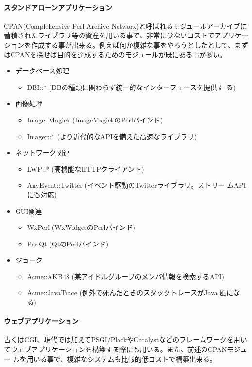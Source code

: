 \documentclass[a4paper,9pt]{jarticle}
\begin{document}
\paragraph{スタンドアローンアプリケーション}
CPAN(Complehensive Perl Archive Network)と呼ばれるモジュールアーカイブに
蓄積されたライブラリ等の資産を用いる事で、非常に少ないコストでアプリケー
ションを作成する事が出来る。例えば何か複雑な事をやろうとしたとして、まず
はCPANを探せば目的を達成するためのモジュールが既にある事が多い。
\begin{itemize}
 \item データベース処理
       \begin{itemize}
	\item DBI::* (DBの種類に関わらず統一的なインターフェースを提供す
	      る)
       \end{itemize}
 \item 画像処理
       \begin{itemize}
	\item Image::Magick (ImageMagickのPerlバインド)
	\item Imager::* (より近代的なAPIを備えた高速なライブラリ)
       \end{itemize}
 \item ネットワーク関連
       \begin{itemize}
	\item LWP::* (高機能なHTTPクライアント)
	\item AnyEvent::Twitter (イベント駆動のTwitterライブラリ。ストリー
	      ムAPIにも対応)
       \end{itemize}
 \item GUI関連
       \begin{itemize}
	\item WxPerl (WxWidgetのPerlバインド)
	\item PerlQt (QtのPerlバインド)
       \end{itemize}
 \item ジョーク
       \begin{itemize}
	\item Acme::AKB48 (某アイドルグループのメンバ情報を検索するAPI)
	\item Acme::JavaTrace (例外で死んだときのスタックトレースがJava
	      風になる)
       \end{itemize}
\end{itemize}

\paragraph{ウェブアプリケーション}
古くはCGI、現代では加えてPSGI/PlackやCatalystなどのフレームワークを用い
てウェブアプリケーションを構築する際にも用いる。また、前述のCPANモジュー
ルを用いる事で、複雑なシステムも比較的低コストで構築出来る。
\end{document}
